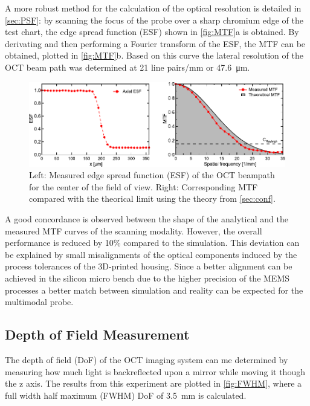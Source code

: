 A more robust method for the calculation of the optical resolution is detailed in \autoref{sec:PSF}: by scanning the focus of the probe over a sharp chromium edge of the test chart, the edge spread function (ESF) shown in \autoref{fig:MTF}a is obtained. By derivating and then performing a Fourier transform of the ESF, the MTF can be obtained, plotted in \autoref{fig:MTF}b. Based on this curve the lateral resolution of the OCT beam path was determined at 21 line pairs/mm or \SI{47.6}{\micro\meter}. 
\begin{figure}[h!]\centering \includegraphics{figures/50_Measurements/conf/res/confResMeas.pdf}
      \caption{Left: Measured edge spread function (ESF) of the OCT beampath for the center of the field of view. 
      Right: Corresponding MTF compared with the theorical limit using the theory from \autoref{sec:conf}.}
      \label{fig:MTF}
\end{figure}
A good concordance is observed between the shape of the analytical and the measured MTF curves of the scanning modality. However, the overall performance is reduced by 10\% compared to the simulation. This deviation can be explained by small misalignments of the optical components induced by the process tolerances of the 3D-printed housing. Since a better alignment can be achieved in the silicon micro bench due to the higher precision of the MEMS processes a better match between simulation and reality can be expected for the multimodal probe.

\subsection{Depth of Field Measurement}
The depth of field (DoF) of the OCT imaging system can me determined by measuring how much light is backreflected upon a mirror while moving it though the z axis. The results from this experiment are plotted in \autoref{fig:FWHM}, where a full width half maximum (FWHM) DoF of \SI{3.5}{\milli\meter} is calculated. 

